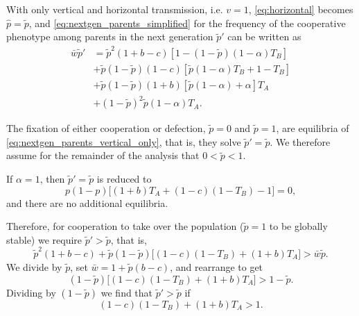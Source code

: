 \documentclass[12pt]{extarticle}
\begin{document}
With only vertical and horizontal transmission, i.e. $v=1$, \autoref{eq:horizontal} becomes
$\hat{p} =  \tilde{p}$,
and \autoref{eq:nextgen_parents_simplified} for the frequency of the cooperative phenotype among parents in the next generation $\tilde{p}'$ can be written as
\begin{equation} \label{eq:nextgen_parents_vertical_only} 
\begin{aligned}
\bar{w} \tilde{p}' 
& = \tilde{p}^2 (1+b-c) [1 - (1-\tilde{p}) (1-\alpha) T_B] \\
& + \tilde{p}(1-\tilde{p}) (1-c) [\tilde{p} (1-\alpha) T_B + 1 - T_B] \\
& + \tilde{p}(1-\tilde{p}) (1+b) [\tilde{p} (1-\alpha) + \alpha] T_A \\
& + (1-\tilde{p})^2 \tilde{p} (1-\alpha) T_A .
\end{aligned}
\end{equation}

The fixation of either cooperation or defection, 
$\tilde{p}=0$ and $ \tilde{p}=1$, are equilibria of \autoref{eq:nextgen_parents_vertical_only}, that is, they solve $\tilde{p}'= \tilde{p}$.
We therefore assume for the remainder of the analysis that $0<\tilde{p}<1$.

If $\alpha=1$, then $\tilde{p}'= \tilde{p}$ is reduced to
\begin{equation}
p(1-p)\big[(1+b)T_A + (1-c)(1-T_B)-1\big] = 0,
\end{equation}
and there are no additional equilibria.

Therefore, for cooperation to take over the population ($\tilde{p}=1$ to be globally stable) we require $\tilde{p}'>\tilde{p}$, that is,
\begin{equation}
  \tilde{p}^2 (1+b-c) + \tilde{p}(1-\tilde{p}) \big[(1-c) (1 - T_B) + (1+b)T_A\big] 
  > \bar{w}\tilde{p} .
\end{equation}
We divide by $\tilde{p}$, set $\bar{w} = 1 + \tilde{p}(b-c)$, and rearrange to get
\begin{equation}
  (1-\tilde{p}) \big[(1-c) (1 - T_B) + (1+b)T_A\big] 
  > 1 -\tilde{p} .
\end{equation}
Dividing by $(1-\tilde{p})$ we find that $\tilde{p}'>\tilde{p}$ if 
\begin{equation} \label{eq:vert_hori_alpha1_global_condition}
  (1-c) (1 - T_B) + (1+b)T_A
  > 1 .
\end{equation}
\end{document}
